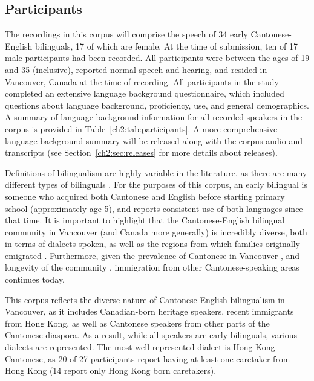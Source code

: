 \subsection{Participants}\label{ch2:subsec:participants} 
The recordings in this corpus will comprise the speech of 34 early Cantonese-English bilinguals, 17 of which are female. At the time of submission, ten of 17 male participants had been recorded. All participants were between the ages of 19 and 35 (inclusive), reported normal speech and hearing, and resided in Vancouver, Canada at the time of recording. All participants in the study completed an extensive language background questionnaire, which included questions about language background, proficiency, use, and general demographics. A summary of language background information for all recorded speakers in the corpus is provided in Table~\ref{ch2:tab:participants}. A more comprehensive language background summary will be released along with the corpus audio and transcripts (see Section~\ref{ch2:sec:releases} for more details about releases).

Definitions of bilingualism are highly variable in the literature, as there are many different types of bilinguals \citep{amengual_2017_type}. For the purposes of this corpus, an early bilingual is someone who acquired both Cantonese and English before starting primary school (approximately age 5), and reports consistent use of both languages since that time. It is important to highlight that the Cantonese-English bilingual community in Vancouver (and Canada more generally) is incredibly diverse, both in terms of dialects spoken, as well as the regions from which families originally emigrated \citep{yu_2013_diaspora}. Furthermore, given the prevalence of Cantonese in Vancouver \citep{statistics_2017_proportion}, and longevity of the community \citep{yu_2013_diaspora}, immigration from other Cantonese-speaking areas continues today. 

This corpus reflects the diverse nature of Cantonese-English bilingualism in Vancouver, as it includes Canadian-born heritage speakers, recent immigrants from Hong Kong, as well as Cantonese speakers from other parts of the Cantonese diaspora. As a result, while all speakers are early bilinguals, various dialects are represented. The most well-represented dialect is Hong Kong Cantonese, as 20 of 27 participants report having at least one caretaker from Hong Kong (14 report only Hong Kong born caretakers). 

